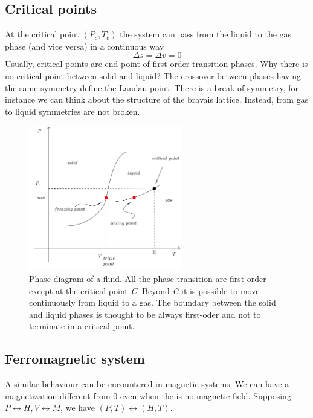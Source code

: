 \documentclass[../../Main/Main.tex]{subfiles}
\begin{document}
\clearpage
\subsection{Critical points}
At the critical point \( (P_c,T_c) \) the system can pass from the liquid to the gas phase (and vice versa) in a continuous way
\begin{equation*}
  \Delta s = \Delta v = 0
\end{equation*}
Usually, critical points are end point of first order transition phases. Why there is no critical point between solid and liquid? The crossover between phases having the same symmetry define the Landau point. There is a break of symmetry, for instance we can think about the structure of the bravais lattice. Instead, from gas to liquid symmetries are not broken.


\begin{figure}[h!]
\centering
\includegraphics[width=0.6\textwidth]{./img/10.pdf}
\caption{\label{fig:}  Phase diagram of a fluid. All the phase transition are first-order except at the critical point \emph{C}. Beyond \emph{C} it is possible to move continuously from liquid to a gas. The boundary between the solid and liquid phases is thought to be always first-oder and not to terminate in a critical point.}
\end{figure}


\subsection{Ferromagnetic system}


A similar behaviour can be encountered in magnetic systems.
We can have a magnetization different from 0 even when the is no magnetic field.
Supposing \( P \leftrightarrow H, V \leftrightarrow M \), we have \( (P,T) \leftrightarrow (H,T) \).
\end{document}
